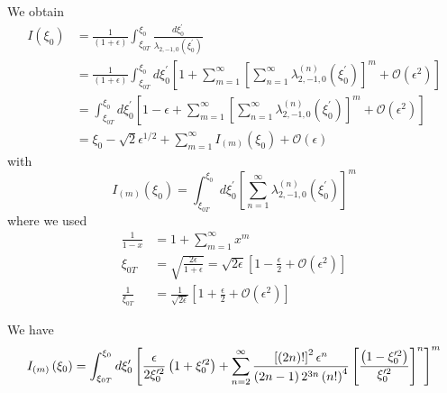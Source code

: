 We obtain
\begin{align*}
I\left( \xi_{0}\right) & =\frac{1}{\left( 1+\epsilon\right) }\int
_{\xi_{0T}}^{\xi_{0}}\frac{d\xi_{0}^{\prime}}{\lambda_{2,-1,0}\left( \xi
_{0}^{\prime}\right) } \\
& =\frac{1}{\left( 1+\epsilon\right) }\int_{\xi_{0T}}^{\xi_{0}}d\xi
_{0}^{\prime}\left[ 1+\sum_{m=1}^{\infty}\left[
\sum_{n=1}^{\infty}\lambda_{2,-1,0}^{(n)}\left( \xi_{0}^{\prime}\right)
\right] ^{m}+\mathcal{O}\left( \epsilon^{2}\right) \right] \\
& =\int_{\xi_{0T}}^{\xi_{0}}d\xi_{0}^{\prime}\left[ 1-\epsilon+\sum
_{m=1}^{\infty}\left[ \sum_{n=1}^{\infty}\lambda_{2,-1,0}^{(n)}\left(
\xi_{0}^{\prime}\right) \right] ^{m}+\mathcal{O}\left( \epsilon^{2}\right)
\right] \\
& =\xi_{0}-\sqrt{2}\epsilon^{1/2}+\sum_{m=1}^{\infty}I_{\left( m\right)
}\left( \xi_{0}\right) +\mathcal{O}\left( \epsilon\right)
\end{align*}
with
\[
I_{\left( m\right) }\left( \xi_{0}\right)
=\int_{\xi_{0T}}^{\xi_{0}}d\xi_{0}^{\prime}\left[
\sum_{n=1}^{\infty}\lambda_{2,-1,0}^{(n)}\left( \xi_{0}^{\prime}\right)
\right] ^{m}
\]
where we used
\begin{align}
\frac{1}{1-x} & =1+\sum_{m=1}^{\infty}x^{m} \\
\xi_{0T} & =\sqrt{\frac{2\epsilon}{1+\epsilon}}=\sqrt{2\epsilon}\left[ 1-%
\frac{\epsilon}{2}+\mathcal{O}\left( \epsilon^{2}\right) \right] \\
\frac{1}{\xi_{0T}} & =\frac{1}{\sqrt{2\epsilon}}\left[ 1+\frac{\epsilon}{2}+%
\mathcal{O}\left( \epsilon^{2}\right) \right]
\end{align}

We have
\[
I_{\left( m\right) }\left( \xi_{0}\right)
=\int_{\xi_{0T}}^{\xi_{0}}d\xi_{0}^{\prime}\left[ \frac{\epsilon}{%
2\xi_{0}^{\prime2}}\left( 1+\xi _{0}^{\prime2}\right) +\sum_{n=2}^{\infty}%
\frac{\left[ \left( 2n\right) !\right] ^{2}\epsilon^{n}}{\left( 2n-1\right)
2^{3n}\left( n!\right) ^{4}}\left[ \frac{\left( 1-\xi_{0}^{\prime2}\right) }{%
\xi_{0}^{\prime2}}\right] ^{n}\right] ^{m}
\]

